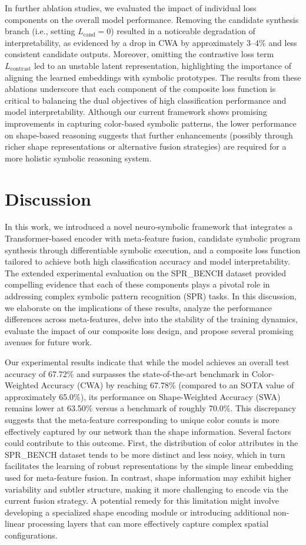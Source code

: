 \documentclass[11pt]{article}
\begin{document}
In further ablation studies, we evaluated the impact of individual loss components on the overall model performance. Removing the candidate synthesis branch (i.e., setting \(L_{\text{cand}}=0\)) resulted in a noticeable degradation of interpretability, as evidenced by a drop in CWA by approximately 3–4\% and less consistent candidate outputs. Moreover, omitting the contrastive loss term \(L_{\text{contrast}}\) led to an unstable latent representation, highlighting the importance of aligning the learned embeddings with symbolic prototypes. The results from these ablations underscore that each component of the composite loss function is critical to balancing the dual objectives of high classification performance and model interpretability. Although our current framework shows promising improvements in capturing color-based symbolic patterns, the lower performance on shape-based reasoning suggests that further enhancements (possibly through richer shape representations or alternative fusion strategies) are required for a more holistic symbolic reasoning system.

\section{Discussion}
In this work, we introduced a novel neuro‐symbolic framework that integrates a Transformer‐based encoder with meta‐feature fusion, candidate symbolic program synthesis through differentiable symbolic execution, and a composite loss function tailored to achieve both high classification accuracy and model interpretability. The extended experimental evaluation on the SPR\_BENCH dataset provided compelling evidence that each of these components plays a pivotal role in addressing complex symbolic pattern recognition (SPR) tasks. In this discussion, we elaborate on the implications of these results, analyze the performance differences across meta-features, delve into the stability of the training dynamics, evaluate the impact of our composite loss design, and propose several promising avenues for future work.

Our experimental results indicate that while the model achieves an overall test accuracy of 67.72\% and surpasses the state-of-the-art benchmark in Color-Weighted Accuracy (CWA) by reaching 67.78\% (compared to an SOTA value of approximately 65.0\%), its performance on Shape-Weighted Accuracy (SWA) remains lower at 63.50\% versus a benchmark of roughly 70.0\%. This discrepancy suggests that the meta-feature corresponding to unique color counts is more effectively captured by our network than the shape information. Several factors could contribute to this outcome. First, the distribution of color attributes in the SPR\_BENCH dataset tends to be more distinct and less noisy, which in turn facilitates the learning of robust representations by the simple linear embedding used for meta-feature fusion. In contrast, shape information may exhibit higher variability and subtler structure, making it more challenging to encode via the current fusion strategy. A potential remedy for this limitation might involve developing a specialized shape encoding module or introducing additional non-linear processing layers that can more effectively capture complex spatial configurations.
\end{document}

